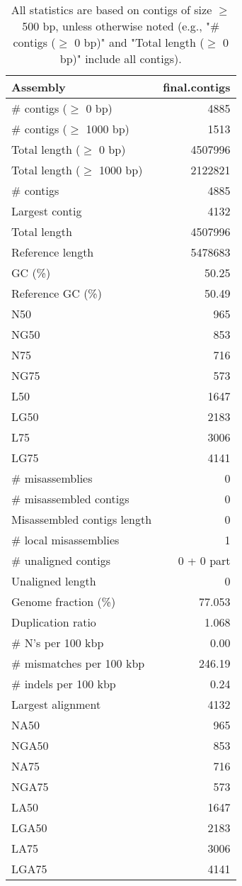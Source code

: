 \documentclass[12pt,a4paper]{article}
\begin{document}
\begin{table}[ht]
\begin{center}
\caption{All statistics are based on contigs of size $\geq$ 500 bp, unless otherwise noted (e.g., "\# contigs ($\geq$ 0 bp)" and "Total length ($\geq$ 0 bp)" include all contigs).}
\begin{tabular}{|l*{1}{|r}|}
\hline
Assembly & final.contigs \\ \hline
\# contigs ($\geq$ 0 bp) & 4885 \\ \hline
\# contigs ($\geq$ 1000 bp) & 1513 \\ \hline
Total length ($\geq$ 0 bp) & 4507996 \\ \hline
Total length ($\geq$ 1000 bp) & 2122821 \\ \hline
\# contigs & 4885 \\ \hline
Largest contig & 4132 \\ \hline
Total length & 4507996 \\ \hline
Reference length & 5478683 \\ \hline
GC (\%) & 50.25 \\ \hline
Reference GC (\%) & 50.49 \\ \hline
N50 & 965 \\ \hline
NG50 & 853 \\ \hline
N75 & 716 \\ \hline
NG75 & 573 \\ \hline
L50 & 1647 \\ \hline
LG50 & 2183 \\ \hline
L75 & 3006 \\ \hline
LG75 & 4141 \\ \hline
\# misassemblies & 0 \\ \hline
\# misassembled contigs & 0 \\ \hline
Misassembled contigs length & 0 \\ \hline
\# local misassemblies & 1 \\ \hline
\# unaligned contigs & 0 + 0 part \\ \hline
Unaligned length & 0 \\ \hline
Genome fraction (\%) & 77.053 \\ \hline
Duplication ratio & 1.068 \\ \hline
\# N's per 100 kbp & 0.00 \\ \hline
\# mismatches per 100 kbp & 246.19 \\ \hline
\# indels per 100 kbp & 0.24 \\ \hline
Largest alignment & 4132 \\ \hline
NA50 & 965 \\ \hline
NGA50 & 853 \\ \hline
NA75 & 716 \\ \hline
NGA75 & 573 \\ \hline
LA50 & 1647 \\ \hline
LGA50 & 2183 \\ \hline
LA75 & 3006 \\ \hline
LGA75 & 4141 \\ \hline
\end{tabular}
\end{center}
\end{table}
\end{document}
